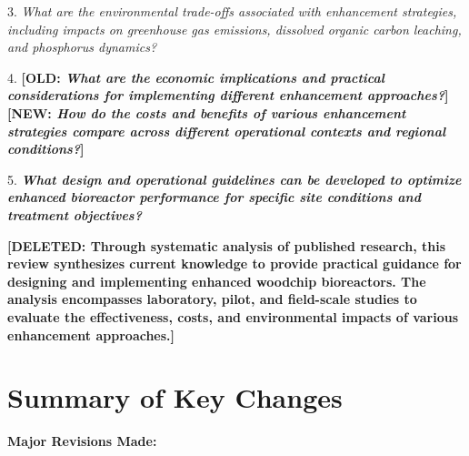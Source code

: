 \documentclass[12pt,a4paper]{article}
\newcommand{\added}[1]{\textcolor{addedtext}{\textbf{#1}}}
\newcommand{\deleted}[1]{\textcolor{deletedtext}{\textbf{[DELETED: #1]}}}
\newcommand{\changed}[2]{\textcolor{deletedtext}{\textbf{[OLD: #1]}} \textcolor{changedtext}{\textbf{[NEW: #2]}}}
\begin{document}
3. \textit{What are the environmental trade-offs associated with enhancement strategies, including impacts on greenhouse gas emissions, dissolved organic carbon leaching, and phosphorus dynamics?}

4. \changed{\textit{What are the economic implications and practical considerations for implementing different enhancement approaches?}}{\textit{How do the costs and benefits of various enhancement strategies compare across different operational contexts and regional conditions?}}

5. \added{\textit{What design and operational guidelines can be developed to optimize enhanced bioreactor performance for specific site conditions and treatment objectives?}}

\deleted{Through systematic analysis of published research, this review synthesizes current knowledge to provide practical guidance for designing and implementing enhanced woodchip bioreactors. The analysis encompasses laboratory, pilot, and field-scale studies to evaluate the effectiveness, costs, and environmental impacts of various enhancement approaches.}

\clearpage

\section*{Summary of Key Changes}

\textbf{Major Revisions Made:}
\end{document}
